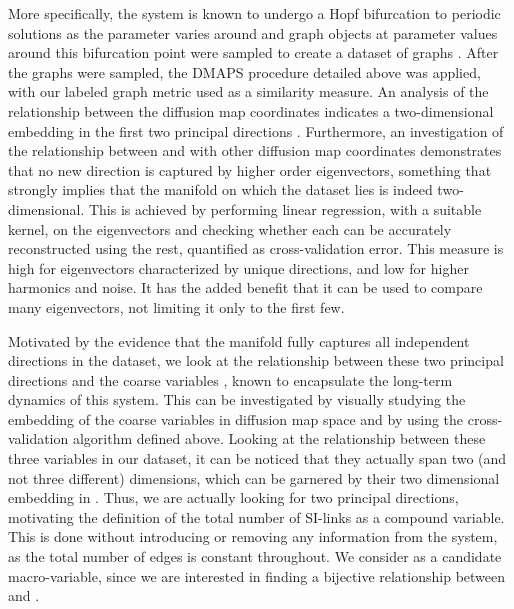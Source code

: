 More specifically, the system is known to undergo a Hopf bifurcation
to periodic solutions as the parameter varies around and graph objects
at parameter values around this bifurcation point were sampled to
create a dataset of graphs . After the graphs were sampled, the DMAPS
procedure detailed above was applied, with our labeled graph metric
used as a similarity measure. An analysis of the relationship between
the diffusion map coordinates indicates a two-dimensional embedding in
the first two principal directions . Furthermore, an investigation of
the relationship between and with other diffusion map coordinates
demonstrates that no new direction is captured by higher order
eigenvectors, something that strongly implies that the manifold on
which the dataset lies is indeed two-dimensional. This is achieved by
performing linear regression, with a suitable kernel, on the
eigenvectors and checking whether each can be accurately reconstructed
using the rest, quantified as cross-validation error. This measure is
high for eigenvectors characterized by unique directions, and low for
higher harmonics and noise. It has the added benefit that it can be
used to compare many eigenvectors, not limiting it only to the first
few.

Motivated by the evidence that the manifold fully captures all
independent directions in the dataset, we look at the relationship
between these two principal directions and the coarse variables ,
known to encapsulate the long-term dynamics of this system. This can
be investigated by visually studying the embedding of the coarse
variables in diffusion map space and by using the cross-validation
algorithm defined above. Looking at the relationship between these
three variables in our dataset, it can be noticed that they actually
span two (and not three different) dimensions, which can be garnered
by their two dimensional embedding in . Thus, we are actually looking
for two principal directions, motivating the definition of the total
number of SI-links as a compound variable. This is done without
introducing or removing any information from the system, as the total
number of edges is constant throughout. We consider as a candidate
macro-variable, since we are interested in finding a bijective
relationship between and .

